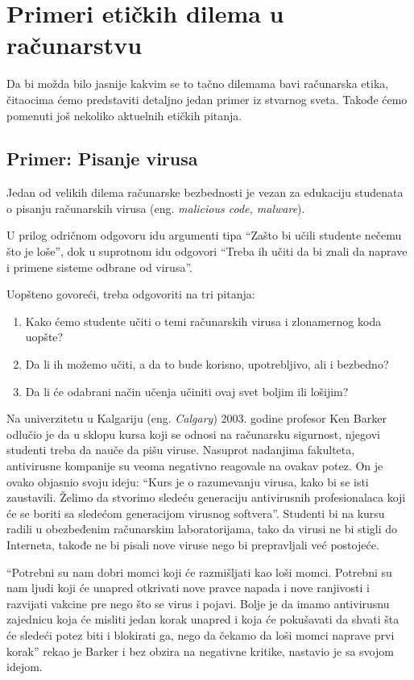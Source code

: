 \documentclass[a4paper]{article}
\begin{document}
\section{Primeri etičkih dilema u računarstvu}

Da bi možda bilo jasnije kakvim se to tačno dilemama bavi računarska etika, čitaocima ćemo predstaviti detaljno jedan primer iz stvarnog sveta. Takođe ćemo pomenuti još nekoliko aktuelnih etičkih pitanja.

\subsection{Primer: Pisanje virusa}
Jedan od velikih dilema računarske bezbednosti je vezan za edukaciju studenata o pisanju računarskih virusa (eng. \textit{malicious code, malware}).

U prilog odričnom odgovoru idu argumenti tipa ``Zašto bi učili studente nečemu što je loše'', dok u suprotnom idu odgovori ``Treba ih učiti da bi znali da
naprave i primene sisteme odbrane od virusa''.

Uopšteno govoreći, treba odgovoriti na tri pitanja:
\begin{enumerate}
	\item Kako ćemo studente učiti o temi računarskih virusa i zlonamernog koda uopšte?
	\item Da li ih možemo učiti, a da to bude korisno, upotrebljivo, ali i bezbedno?
	\item Da li će odabrani način učenja učiniti ovaj svet boljim ili lošijim?
\end{enumerate}

Na univerzitetu u Kalgariju (eng. \textit{Calgary}) 2003. godine profesor Ken Barker odlučio je da u sklopu kursa koji se odnosi na računarsku sigurnost, njegovi
studenti treba da nauče da pišu viruse. Nasuprot nadanjima fakulteta, antivirusne kompanije su veoma negativno reagovale na ovakav potez.
On je ovako objasnio svoju ideju: ``Kurs je o razumevanju virusa, kako bi se isti zaustavili.
Želimo da stvorimo sledeću generaciju antivirusnih profesionalaca koji će se boriti sa sledećom generacijom virusnog softvera''.
Studenti bi na kursu radili u obezbeđenim računarskim laboratorijama, tako da virusi ne bi stigli do Interneta, takođe ne bi pisali nove viruse nego 
bi prepravljali već postojeće.

``Potrebni su nam dobri momci koji će razmišljati kao loši momci. Potrebni su nam ljudi koji će unapred otkrivati nove pravce napada i nove ranjivosti i razvijati vakcine pre nego što se virus i pojavi.
Bolje je da imamo antivirusnu zajednicu koja će misliti jedan korak unapred i koja će pokušavati da shvati šta će sledeći potez biti i blokirati ga, nego da čekamo da loši momci naprave prvi korak''
rekao je Barker i bez obzira na negativne kritike, nastavio je sa svojom idejom.
\end{document}
